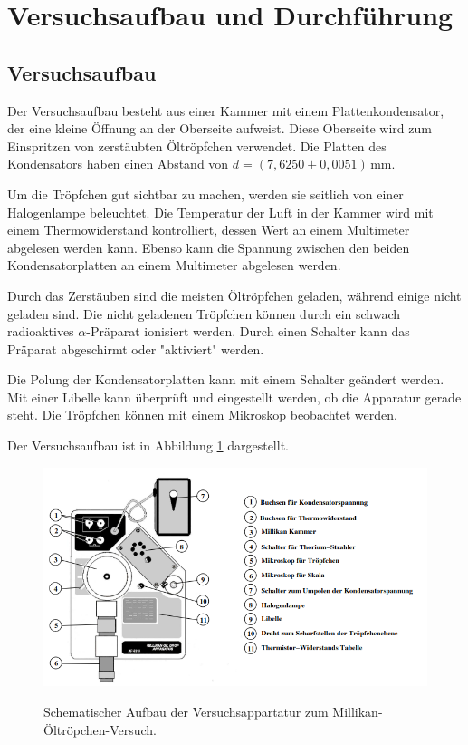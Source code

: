 \section{Versuchsaufbau und Durchführung}
\label{sec:Durchführung}

\subsection{Versuchsaufbau}
\label{subsec:Versuchsaufbau}
Der Versuchsaufbau besteht aus einer Kammer mit einem Plattenkondensator, der eine kleine Öffnung an der Oberseite aufweist. 
Diese Oberseite wird zum Einspritzen von zerstäubten Öltröpfchen verwendet. Die Platten des Kondensators haben einen Abstand 
von $d = (7,6250 \pm 0,0051) \, \si{\milli\meter}$.

Um die Tröpfchen gut sichtbar zu machen, werden sie seitlich von einer Halogenlampe beleuchtet. Die Temperatur der Luft in der 
Kammer wird mit einem Thermowiderstand kontrolliert, dessen Wert an einem Multimeter abgelesen werden kann. Ebenso kann die 
Spannung zwischen den beiden Kondensatorplatten an einem Multimeter abgelesen werden.

Durch das Zerstäuben sind die meisten Öltröpfchen geladen, während einige nicht geladen sind. Die nicht geladenen Tröpfchen 
können durch ein schwach radioaktives $\alpha$-Präparat ionisiert werden. Durch einen Schalter kann das Präparat abgeschirmt 
oder "aktiviert" werden.

Die Polung der Kondensatorplatten kann mit einem Schalter geändert werden. Mit einer Libelle kann überprüft und eingestellt 
werden, ob die Apparatur gerade steht. Die Tröpfchen können mit einem Mikroskop beobachtet werden.

Der Versuchsaufbau ist in Abbildung \ref{fig:Versuchsaufbau} dargestellt.

\begin{figure}[H]
    \centering
    \caption{Schematischer Aufbau der Versuchsappartatur zum Millikan-Öltröpchen-Versuch.\cite{1}}
    \includegraphics[width=\textwidth]{Bilder/Versuchsaufbau.png}
    \label{fig:Versuchsaufbau}
\end{figure}


